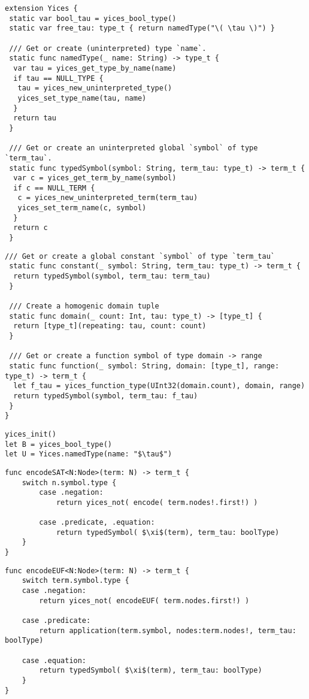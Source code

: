 \begin{lstlisting}[language=FLEA]
extension Yices {
 static var bool_tau = yices_bool_type()
 static var free_tau: type_t { return namedType("\( \tau \)") }

 /// Get or create (uninterpreted) type `name`.
 static func namedType(_ name: String) -> type_t {
  var tau = yices_get_type_by_name(name)
  if tau == NULL_TYPE {
   tau = yices_new_uninterpreted_type()
   yices_set_type_name(tau, name)
  }
  return tau
 }

 /// Get or create an uninterpreted global `symbol` of type `term_tau`.
 static func typedSymbol(symbol: String, term_tau: type_t) -> term_t {
  var c = yices_get_term_by_name(symbol)
  if c == NULL_TERM {
   c = yices_new_uninterpreted_term(term_tau)
   yices_set_term_name(c, symbol)
  }
  return c
 }
\end{lstlisting}

\begin{lstlisting}[language=FLEA]
 /// Get or create a global constant `symbol` of type `term_tau`
 static func constant(_ symbol: String, term_tau: type_t) -> term_t {
  return typedSymbol(symbol, term_tau: term_tau)
 }

 /// Create a homogenic domain tuple
 static func domain(_ count: Int, tau: type_t) -> [type_t] {
  return [type_t](repeating: tau, count: count)
 }

 /// Get or create a function symbol of type domain -> range
 static func function(_ symbol: String, domain: [type_t], range: type_t) -> term_t {
  let f_tau = yices_function_type(UInt32(domain.count), domain, range)
  return typedSymbol(symbol, term_tau: f_tau)
 }
}
\end{lstlisting}

\begin{lstlisting}[language=FLEA, caption={SMT encoding}]
yices_init()
let B = yices_bool_type()
let U = Yices.namedType(name: "$\tau$")
\end{lstlisting}

\begin{lstlisting}[language=FLEA, caption={Propositional encoding}]
func encodeSAT<N:Node>(term: N) -> term_t {
	switch n.symbol.type {
		case .negation:
			return yices_not( encode( term.nodes!.first!) )

		case .predicate, .equation:
			return typedSymbol( $\xi$(term), term_tau: boolType)
	}
}
\end{lstlisting}

\begin{lstlisting}[language=FLEA, caption={EUF encoding}]
func encodeEUF<N:Node>(term: N) -> term_t {
	switch term.symbol.type {
	case .negation:
		return yices_not( encodeEUF( term.nodes.first!) )

	case .predicate:
		return application(term.symbol, nodes:term.nodes!, term_tau: boolType)

	case .equation:
		return typedSymbol( $\xi$(term), term_tau: boolType)
	}
}
\end{lstlisting}


